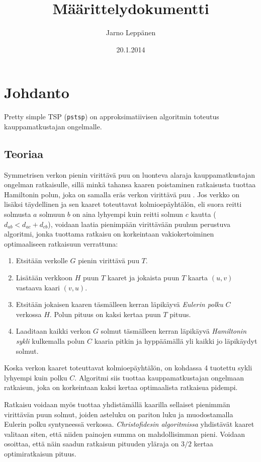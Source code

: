 \documentclass[a4paper]{scrartcl}
\author{Jarno Leppänen}
\title{Määrittelydokumentti}
\date{20.1.2014}
\begin{document}
\maketitle

\section{Johdanto}
Pretty simple TSP (\texttt{pstsp}) on approksimatiivisen
algoritmin toteutus kauppamatkustajan ongelmalle.

\subsection{Teoriaa}
Symmetrisen verkon pienin virittävä puu on luonteva alaraja kauppamatkustajan
ongelman ratkaisulle, sillä minkä tahansa kaaren poistaminen ratkaisusta
tuottaa Hamiltonin polun, joka on samalla eräs verkon virittävä puu \cite{wi}.
Jos verkko on lisäksi täydellinen ja sen kaaret toteuttavat kolmioepäyhtälön,
eli suora reitti solmusta $a$ solmuun $b$ on aina lyhyempi
kuin reitti solmun $c$ kautta ($d_{ab} < d_{ac} + d_{cb}$), voidaan
laatia pienimpään virittävään puuhun perustuva algoritmi, jonka tuottama
ratkaisu on korkeintaan vakiokertoiminen optimaaliseen ratkaisuun verrattuna:
\begin{enumerate}
    \item Etsitään verkolle $G$ pienin virittävä puu $T$.
    \item Lisätään verkkoon $H$ puun $T$ kaaret ja jokaista puun $T$ kaarta
          $(u, v)$ vastaava kaari $(v, u)$.
    \item Etsitään jokaisen kaaren täsmälleen kerran läpikäyvä
          \emph{Eulerin polku} $C$
          verkossa $H$. Polun pituus on kaksi kertaa
          puun $T$ pituus.
    \item Laaditaan kaikki verkon $G$ solmut täsmälleen kerran läpikäyvä
          \emph{Hamiltonin sykli} kulkemalla polun $C$ kaaria pitkin ja
          hyppäämällä yli kaikki jo läpikäydyt solmut.
\end{enumerate}
Koska verkon kaaret toteuttavat kolmioepäyhtälön, on kohdassa 4 tuotettu sykli
lyhyempi kuin polku $C$. Algoritmi siis tuottaa kauppamatkustajan ongelmaan
ratkaisun, joka on korkeintaan kaksi kertaa optimaalista ratkaisua pidempi.

Ratkaisu voidaan myös tuottaa yhdistämällä kaarilla sellaiset 
pienimmän virittävän puun solmut, joiden asteluku on pariton luku ja
muodostamalla Eulerin polku syntyneessä verkossa.
\emph{Christofidesin algoritmissa}\cite{ch} yhdistävät kaaret valitaan
siten, että niiden painojen summa on mahdollisimman pieni. Voidaan
osoittaa, että näin saadun ratkaisun pituuden yläraja on $3/2$ kertaa 
optimiratkaisun pituus.
\end{document}

